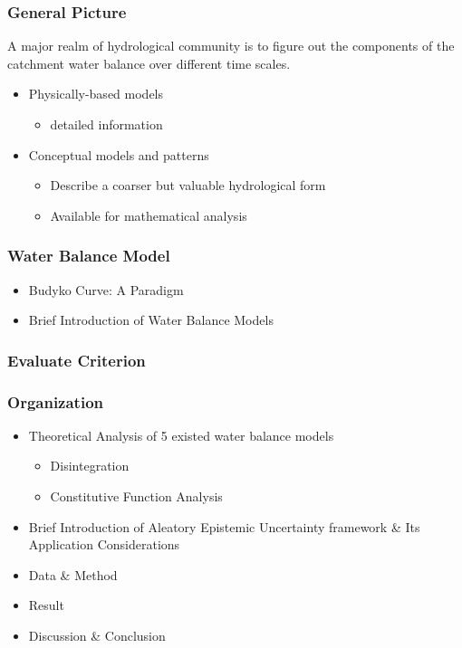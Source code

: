 \documentclass{beamer}
\begin{document}
\begin{frame}
\frametitle{General Picture}
A major realm of hydrological community is to figure out the components of the catchment water balance over different time scales.
\begin{itemize}
\item Physically-based models
\begin{itemize}
\item detailed information
\end{itemize}
\item Conceptual models and patterns
\begin{itemize}
\item Describe a coarser but valuable hydrological form
\item Available for mathematical analysis
\end{itemize}
\end{itemize}
\end{frame}
\begin{frame}
\frametitle{Water Balance Model}
\begin{itemize}
\item Budyko Curve: A Paradigm
\item Brief Introduction of Water Balance Models 
\end{itemize} 
\end{frame}

\begin{frame}
\frametitle{Evaluate Criterion}
\end{frame}

\begin{frame}
\frametitle{Organization}
\begin{itemize}
\item  Theoretical Analysis of 5 existed water balance models
\begin{itemize}
\item Disintegration
\item Constitutive Function Analysis
\end{itemize}
\item  Brief Introduction of Aleatory Epistemic Uncertainty framework \& Its Application Considerations
\item Data \& Method
\item Result
\item Discussion \& Conclusion
\end{itemize}
\end{frame}
\end{document}
